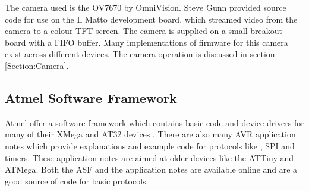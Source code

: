 The camera used is the OV7670 by OmniVision. Steve Gunn provided source code for use on the Il Matto development board, which streamed video from the camera to a colour TFT screen. The camera is supplied on a small breakout board with a FIFO buffer. Many implementations of firmware for this camera exist across different devices. The camera operation is discussed in section \ref{Section:Camera}. 
\subsection{Atmel Software Framework}

Atmel offer a software framework which contains basic code and device drivers for many of their XMega and AT32 devices \citep{Atmel:ASF}. There are also many AVR application notes which provide explanations and example code for protocols like \itc , SPI and timers. These application notes are aimed at older devices like the ATTiny and ATMega. Both the ASF and the application notes are available online and are a good source of code for basic protocols.

%
%
%
%
%


